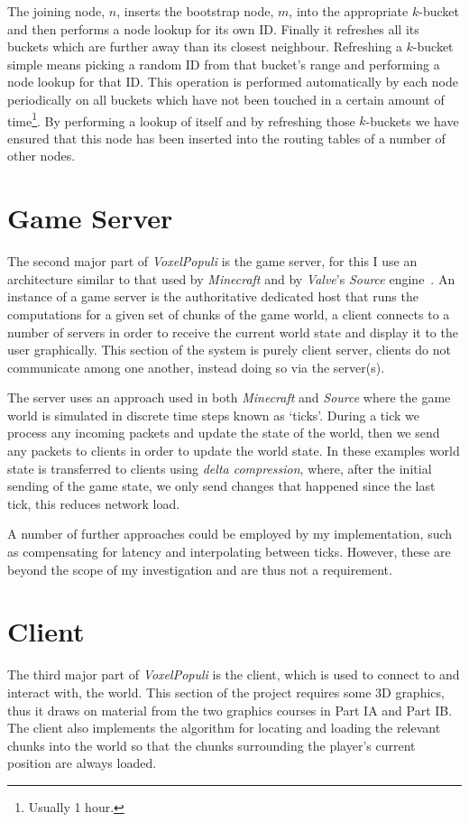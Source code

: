 \documentclass[12pt,notitlepage,a4paper]{report}
\newcommand{\K}{$k$}
\newcommand{\voxpop}{\emph{VoxelPopuli}}
\begin{document}
	The joining node, $n$, inserts the bootstrap node, $m$, into the appropriate \K-bucket and then performs a node lookup for its own ID. Finally it refreshes all its buckets which are further away than its closest neighbour. Refreshing a \K-bucket simple means picking a random ID from that bucket's range and performing a node lookup for that ID. This operation is performed automatically by each node periodically on all buckets which have not been touched in a certain amount of time\footnote{Usually 1 hour.}. By performing a lookup of itself and by refreshing those \K-buckets we have ensured that this node has been inserted into the routing tables of a number of other nodes.
	
	\section{Game Server}
	The second major part of \voxpop{} is the game server, for this I use an architecture similar to that used by \emph{Minecraft} and by \emph{Valve}'s \emph{Source} engine~\cite{source}. An instance of a game server is the authoritative dedicated host that runs the computations for a given set of chunks of the game world, a client connects to a number of servers in order to receive the current world state and display it to the user graphically. This section of the system is purely client server, clients do not communicate among one another, instead doing so via the server(s).
	
	The server uses an approach used in both \emph{Minecraft} and \emph{Source} where the game world is simulated in discrete time steps known as `ticks'. During a tick we process any incoming packets and update the state of the world, then we send any packets to clients in order to update the world state. In these examples world state is transferred to clients using \emph{delta compression}, where, after the initial sending of the game state, we only send changes that happened since the last tick, this reduces network load.
	
	A number of further approaches could be employed by my implementation, such as compensating for latency and interpolating between ticks. However, these are beyond the scope of my investigation and are thus not a requirement.

	\section{Client}
	The third major part of \voxpop{} is the client, which is used to connect to and interact with, the world. This section of the project requires some 3D graphics, thus it draws on material from the two graphics courses in Part IA and Part IB. The client also implements the algorithm for locating and loading the relevant chunks into the world so that the chunks surrounding the player's current position are always loaded.
	
\end{document}
